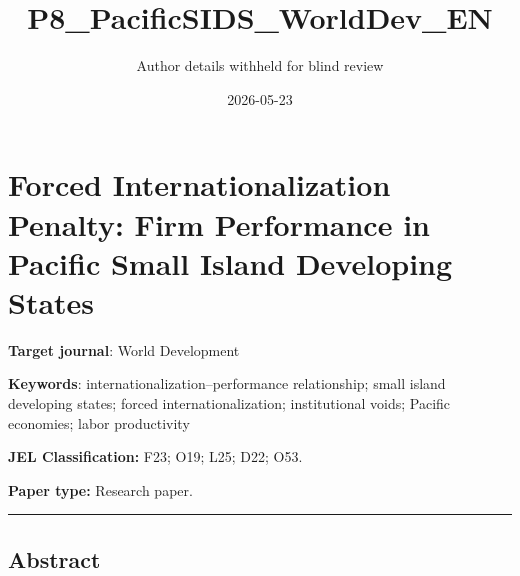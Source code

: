 \documentclass[12pt,a4paper]{article}
\title{P8\_PacificSIDS\_WorldDev\_EN}
\author{Author details withheld for blind review}
\date{2026-05-23}
\begin{document}
\maketitle

\hypertarget{forced-internationalization-penalty-firm-performance-in-pacific-small-island-developing-states}{%
\section{Forced Internationalization Penalty: Firm Performance in
Pacific Small Island Developing
States}\label{forced-internationalization-penalty-firm-performance-in-pacific-small-island-developing-states}}

\textbf{Target journal}: World Development

\textbf{Keywords}: internationalization--performance relationship; small
island developing states; forced internationalization; institutional
voids; Pacific economies; labor productivity

\textbf{JEL Classification:} F23; O19; L25; D22; O53.

\textbf{Paper type:} Research paper.

\begin{center}\rule{0.5\linewidth}{0.5pt}\end{center}

\hypertarget{abstract}{%
\subsection{Abstract}\label{abstract}}
\end{document}
